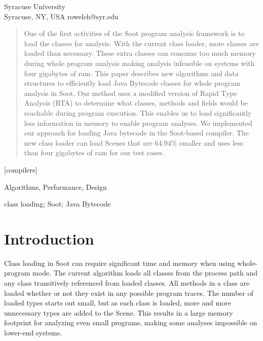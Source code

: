 \documentclass[preprint]{sigplanconf}
\begin{document}
           {Syracuse University\\Syracuse, NY, USA}
           {rowelch@syr.edu}       
    
           

\maketitle

\begin{abstract}
One of the first activities of the Soot program analysis framework is to load 
the classes for analysis. With the current class loader, more classes are loaded
than necessary. These extra classes can consume too much memory during whole program
analysis making analysis infeasible on systems with four gigabytes of ram. This paper 
describes new algorithms and data structures to efficiently load Java
Bytecode classes for whole program analysis in Soot. Our method uses a modified 
version of Rapid Type Analysis (RTA) to determine what classes, methods and 
fields would be reachable during program execution. This enables us to load 
significantly less information in memory to enable program analyses.
We implemented our approach for loading Java bytecode in the Soot-based \rb 
compiler. The new class loader can load Scenes that are 64.94\% smaller and uses less than four gigabytes of ram for our test cases.
\end{abstract}

[compilers]

\terms
Algorithms, Performance, Design

\keywords
class loading; Soot; Java Bytecode

\section{Introduction}
\label{sec:intro}
Class loading in Soot \cite{soot-retro, soot-orig} can require significant time 
and memory when using whole-program mode. The current algorithm loads all 
classes from the process path and any class transitively referenced from loaded 
classes. All methods in a class are loaded whether or not they exist in any 
possible program traces. The number of loaded types starts out small, but as 
each class is loaded, more and more unnecessary types are added to the Scene. 
This results in a large memory footprint for analyzing even small programs, 
making some analyses impossible on lower-end systems.
\end{document}
